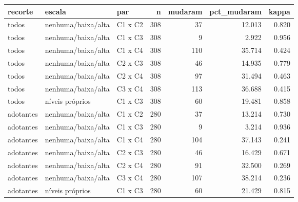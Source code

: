 \begin{tabular}{lllrrrr}
\toprule
recorte & escala & par & n & mudaram & pct_mudaram & kappa \\
\midrule
todos & nenhuma/baixa/alta & C1 x C2 & 308 & 37 & 12.013 & 0.820 \\
todos & nenhuma/baixa/alta & C1 x C3 & 308 & 9 & 2.922 & 0.956 \\
todos & nenhuma/baixa/alta & C1 x C4 & 308 & 110 & 35.714 & 0.424 \\
todos & nenhuma/baixa/alta & C2 x C3 & 308 & 46 & 14.935 & 0.779 \\
todos & nenhuma/baixa/alta & C2 x C4 & 308 & 97 & 31.494 & 0.463 \\
todos & nenhuma/baixa/alta & C3 x C4 & 308 & 113 & 36.688 & 0.415 \\
todos & níveis próprios & C1 x C3 & 308 & 60 & 19.481 & 0.858 \\
adotantes & nenhuma/baixa/alta & C1 x C2 & 280 & 37 & 13.214 & 0.730 \\
adotantes & nenhuma/baixa/alta & C1 x C3 & 280 & 9 & 3.214 & 0.936 \\
adotantes & nenhuma/baixa/alta & C1 x C4 & 280 & 104 & 37.143 & 0.241 \\
adotantes & nenhuma/baixa/alta & C2 x C3 & 280 & 46 & 16.429 & 0.671 \\
adotantes & nenhuma/baixa/alta & C2 x C4 & 280 & 91 & 32.500 & 0.269 \\
adotantes & nenhuma/baixa/alta & C3 x C4 & 280 & 107 & 38.214 & 0.236 \\
adotantes & níveis próprios & C1 x C3 & 280 & 60 & 21.429 & 0.815 \\
\bottomrule
\end{tabular}
